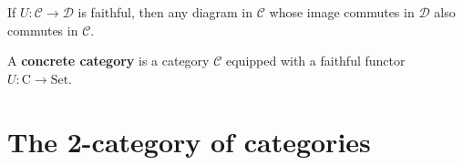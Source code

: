 \documentclass[12pt, oneside]{book}
\begin{document}
\begin{lemma}
    If $U: \mathcal{C} \rightarrow \mathcal{D}$ is faithful, then any diagram in $\mathcal{C}$ whose image commutes in $\mathcal{D}$ also commutes in $\mathcal{C}$.
\end{lemma}

\begin{definition}
    A \textbf{concrete category} is a category $\mathcal{C}$ equipped with a faithful functor $U: \mathrm{C} \rightarrow \mathrm{Set}$.
\end{definition}



































































\section{The 2-category of categories}
\end{document}

